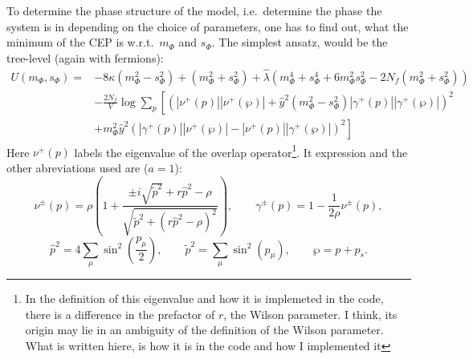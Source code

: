 To determine the phase structure of the model, i.e.\ determine the phase the system is in depending on the choice of parameters, 
one has to find out, what the minimum of the CEP is w.r.t.\ $m_{\Phi}$ and $s_{\Phi}$. The simplest ansatz, would be the tree-level (again with fermions):
\begin{align}\label{eq:CEP_treelevel}
 U(m_{\Phi}, s_{\Phi}) =& -8 \kappa \left( m_{\Phi}^2 - s_{\Phi}^2 \right)   +   \left( m_{\Phi}^2 + s_{\Phi}^2 \right)
                         + \hat\lambda \left( m_{\Phi}^4 + s_{\Phi}^4 + 6 m_{\Phi}^2 s_{\Phi}^2 - 2 N_f \left(m_{\Phi}^2 + s_{\Phi}^2 \right) \right) 
                           \nonumber \\
                        & -\frac{2N_f}{V} \log \sum\limits_p
                                    \left[ \left( |\nu^+(p)| |\nu^+(\wp)|   +
                                    \hat y ^2 \left( m_{\Phi}^2 - s_{\Phi}^2 \right) |\gamma^+(p)| |\gamma^+(\wp)|\right)^2 
                                    \nonumber \right. \\ 
                        & \left. +  m_{\Phi}^2 \hat y^2 \left( |\gamma^+(p)| |\nu^+(\wp)|   -   |\nu^+(p)| |\gamma^+(\wp)| \right)^2\right]
\end{align}
Here $\nu^+(p)$ labels the eigenvalue of the overlap operator\footnote{In the definition of this eigenvalue and how it is implemeted in the 
code, there is a difference in the prefactor of $r$, the Wilson parameter. I think, its origin may lie in an ambiguity of
the definition of the Wilson parameter. What is written hiere, is how it is in the code and how I implemented it}. 
It expression and the other abreviations used are ($a=1$):
\begin{equation}
 \label{eq:eigenvalue_overlapOperator_and_gamma}
 \nu^{\pm}(p) = \rho \left( 1 + 
                      \frac{ \pm i \sqrt{{\tilde p} ^2} + r  {\hat p}^2 - \rho}
                           {\sqrt{ {\tilde p} ^2 + \left( r  {\hat p}^2 - \rho\right)^2}}\right),\qquad
 \gamma^{\pm}(p) = 1- \frac{1}{2 \rho}\nu^{\pm}(p),
 \end{equation}
 \begin{equation}
 \label{eq:def_momentumAbreviations}
 {\hat p}^2 = 4 \sum\limits_{\mu} \sin^2\left(\frac{p_{\mu}}{2}\right),\qquad
 {\tilde p}^2 = \sum\limits_{\mu} \sin^2\left(p_{\mu}\right),\qquad
 \wp = p + p_s.
\end{equation}

